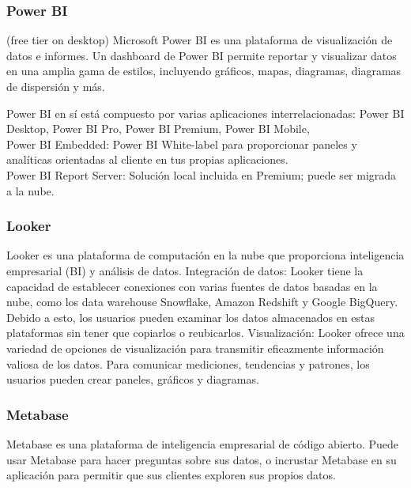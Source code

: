 \documentclass[12pt]{book}
\begin{document}

\subsubsection{Power BI} (free tier on desktop)
Microsoft Power BI es una plataforma de visualización de datos e informes. Un dashboard de Power BI permite reportar y visualizar 
datos en una amplia gama de estilos, incluyendo gráficos, mapas, diagramas, diagramas de dispersión y más.

Power BI en sí está compuesto por varias aplicaciones interrelacionadas: Power BI Desktop, Power BI Pro, Power BI Premium, Power BI Mobile,\\
Power BI Embedded: Power BI White-label para proporcionar paneles y analíticas orientadas al cliente en tus propias aplicaciones.\\
Power BI Report Server: Solución local incluida en Premium; puede ser migrada a la nube.\\

\subsubsection{Looker}
Looker es una plataforma de computación en la nube que proporciona inteligencia empresarial (BI) y análisis de datos.
Integración de datos: Looker tiene la capacidad de establecer conexiones con varias fuentes de datos basadas en la nube, como los data warehouse Snowflake, Amazon Redshift y Google BigQuery. Debido a esto, los usuarios pueden examinar los datos almacenados en estas plataformas sin tener que copiarlos o reubicarlos.
Visualización: Looker ofrece una variedad de opciones de visualización para transmitir eficazmente información valiosa de los datos. Para comunicar mediciones, tendencias y patrones, los usuarios pueden crear paneles, gráficos y diagramas.

\subsubsection{Metabase}
Metabase es una plataforma de inteligencia empresarial de código abierto. Puede usar Metabase para hacer preguntas sobre sus datos, o incrustar Metabase en su aplicación para permitir que sus clientes exploren sus propios datos.
\end{document}

